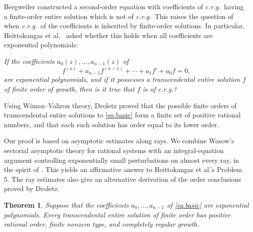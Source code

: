 \documentclass[a4paper,12pt]{article}
\newtheorem{theorem}[defin]{Theorem}
\numberwithin{equation}{section}
\begin{document}

   Bergweiler \cite[Theorems~1.1 and~1.2]{Bergweiler}  constructed a second-order equation with coefficients of \textit{c.r.g.}\ having a finite-order entire solution which is not of \textit{c.r.g.}\ This raises the question of when \textit{c.r.g.}\ of the coefficients is inherited by finite-order solutions. In particular, Heittokangas et al.\ \cite[p.~33, Problem~5]{HITW2022} asked whether this holds when all coefficients are exponential polynomials:
   
   
    
    \bigskip
    \noindent
     \emph{
     	If the coefficients $a_0(z),\ldots, a_{n-1}(z)$ of \begin{equation}\label{eq.basic}
     	f^{(n)}+a_{n-1}f^{(n-1)}+\cdots+a_1f'+a_0f=0,
     	\end{equation}
     	 are exponential polynomials, and if it  possesses a transcendental entire solution $f$ of finite order of growth,
     	then is it true that $f$ is of \textit{c.r.g.}?}

    \bigskip
Using Wiman--Valiron theory, Droletz \cite{Droletz} proved that the
possible finite orders of transcendental entire solutions to
\eqref{eq.basic} form a finite set of positive rational numbers,
and that each such solution has order equal to its lower order.

Our proof is based on asymptotic estimates along rays. We combine Wasow's sectorial asymptotic theory for rational systems with an integral-equation argument controlling exponentially small perturbations on almost every ray, in the spirit of \cite{CGM}. This yields an affirmative answer to Heittokangas et al.'s Problem 5.
The ray estimates also give an alternative derivation of the order
conclusions proved by Droletz.

\begin{theorem}\label{Thm.intro}
Suppose that the coefficients $a_0,\ldots,a_{n-1}$ of \eqref{eq.basic}
are exponential polynomials. Every transcendental entire solution of
finite order has positive rational order, finite nonzero type, and
completely regular growth.
\end{theorem}
\end{document}
